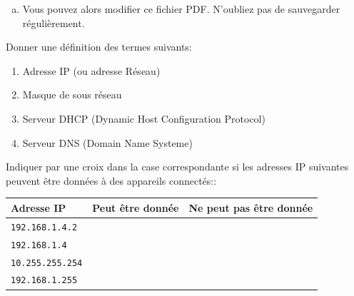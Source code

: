 \documentclass[a4paper,10pt]{report}
\renewcommand{\arraystretch}{1}  %
\def\ptsexoA{4}
\def\ptsexoB{2}
\def\ptsexoC{3}
\begin{document}
\begin{Form}
\begin{enumerate}[a)]
    (Ce PC $\rightarrow$ \verb|P:\ Espace personnel de xxx \ 1NSI-DSinternet| )
    \item Vous pouvez alors modifier ce fichier PDF. N'oubliez pas de sauvegarder régulièrement.
\end{enumerate}


\bigskip

\exodst{\ptsexoA}



Donner une définition des termes suivants:

\begin{enumerate}
    \item Adresse IP (ou adresse Réseau) \hfill \Bareme{} 
    
\longfield{3cm}

\item Masque de sous réseau \hfill \Bareme{} 
    
\longfield{3cm}

\item Serveur DHCP (Dynamic Host Configuration Protocol) \hfill \Bareme{}

\longfield{3cm}

\item Serveur DNS (Domain Name Systeme) \hfill \Bareme{}

\longfield{3cm}
\end{enumerate}


\medskip

\exodst{\ptsexoB}

Indiquer par une croix dans la case correspondante si les adresses IP suivantes peuvent être données à des appareils connectés::
    
\renewcommand{\arraystretch}{1.5}
\begin{tabular}{|p{6cm}|c|c|}
    \hline
    \textbf{Adresse IP} & \textbf{Peut être donnée} & \textbf{Ne peut pas être donnée} \\
    \hline
    \verb|192.168.1.4.2| & \checkbox{} & \checkbox{} \\
    \hline
    \verb|192.168.1.4| & \checkbox{} & \checkbox{} \\
    \hline
    \verb|10.255.255.254| & \checkbox{} & \checkbox{} \\
    \hline
    \verb|192.168.1.255| & \checkbox{} & \checkbox{} \\
    \hline
\end{tabular}

\medskip


\exodst{\ptsexoC}


\end{Form}
\end{document}
